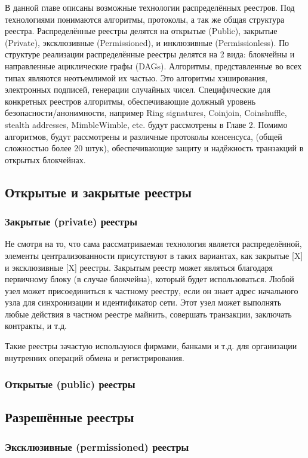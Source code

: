 В данной главе описаны возможные технологии распределённых реестров. Под
технологиями понимаются алгоритмы, протоколы, а так же общая структура реестра.
Распределённые реестры делятся на открытые (Public), закрытые (Private),
эксклюзивные (Permissioned), и инклюзивные (Permissionless).
По структуре реализации распределённые реестры делятся на 2 вида: блокчейны и
направленные ациклические графы (DAGs). Алгоритмы, представленные во всех типах
являются неотъемлимой их частью. Это алгоритмы хэширования, электронных
подписей, генерации случайных чисел. Специфические для конкретных реестров
алгоритмы, обеспечивающие должный уровень безопасности/анонимности, например
Ring signatures, Coinjoin, Coinshuffle, stealth addresses, MimbleWimble, etc.
будут рассмотрены в Главе 2. Помимо алгоритмов, будут рассмотрены и различные
протоколы консенсуса, (общей сложностью более 20 штук), обеспечивающие защиту и
надёжность транзакций в открытых блокчейнах.


\subsection{Открытые и закрытые реестры}
\subsubsection{Закрытые (private) реестры}
Не смотря на то, что сама рассматриваемая технология является распределённой,
элементы централизованности присутствуют в таких вариантах, как закрытые [X] и
эксклюзивные [X] реестры. Закрытым реестр может являться благодаря первичному
блоку (в случае блокчейна), который будет использоваться. Любой узел может
присоединиться к частному реестру, если он знает адрес начального узла
для синхронизации и идентификатор сети. Этот узел может выполнять
любые действия в частном реестре майнить, совершать транзакции, заключать
контракты, и т.д.

Такие реестры зачастую используюся фирмами, банками и т.д. для организации
внутренних операций обмена и регистрирования.

\subsubsection{Открытые (public) реестры}


\subsection{Разрешённые реестры}
\subsubsection{Эксклюзивные (permissioned) реестры}
